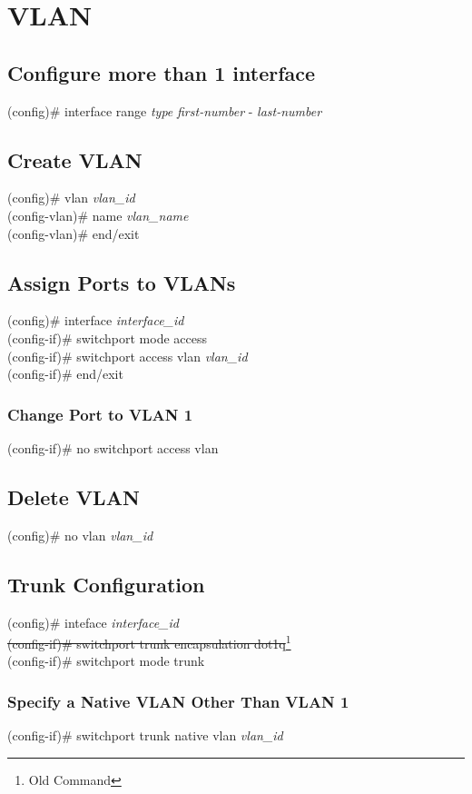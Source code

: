 \section{VLAN}
\subsection{Configure more than 1 interface}
(config)\# interface range \textit{type} \textit{first-number} - \textit{last-number}

\subsection{Create VLAN}
(config)\# vlan \textit{vlan\_id}\\
(config-vlan)\# name \textit{vlan\_name}\\
(config-vlan)\# end/exit

\subsection{Assign Ports to VLANs}
(config)\# interface \textit{interface\_id}\\
(config-if)\# switchport mode access\\
(config-if)\# switchport access vlan \textit{vlan\_id}\\
(config-if)\# end/exit
\subsubsection*{Change Port to VLAN 1}
(config-if)\# no switchport access vlan

\subsection{Delete VLAN}
(config)\# no vlan \textit{vlan\_id}

\subsection{Trunk Configuration}
(config)\# inteface \textit{interface\_id}\\
\sout{(config-if)\# switchport trunk encapsulation dot1q}\footnote{Old Command}\\
(config-if)\# switchport mode trunk
\subsubsection*{Specify a Native VLAN Other Than VLAN 1}
(config-if)\# switchport trunk native vlan \textit{vlan\_id}
